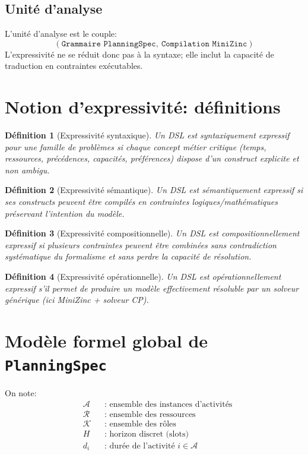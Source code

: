 \documentclass[12pt,a4paper]{article}
\newtheorem{definition}{Définition}
\begin{document}
\subsection{Unité d'analyse}
L'unité d'analyse est le couple:
\[
(\texttt{Grammaire PlanningSpec},\ \texttt{Compilation MiniZinc})
\]
L'expressivité ne se réduit donc pas à la syntaxe; elle inclut la capacité de traduction en contraintes exécutables.

\section{Notion d'expressivité: définitions}
\begin{definition}[Expressivité syntaxique]
Un DSL est syntaxiquement expressif pour une famille de problèmes si chaque concept métier critique (temps, ressources, précédences, capacités, préférences) dispose d'un construct explicite et non ambigu.
\end{definition}

\begin{definition}[Expressivité sémantique]
Un DSL est sémantiquement expressif si ses constructs peuvent être compilés en contraintes logiques/mathématiques préservant l'intention du modèle.
\end{definition}

\begin{definition}[Expressivité compositionnelle]
Un DSL est compositionnellement expressif si plusieurs contraintes peuvent être combinées sans contradiction systématique du formalisme et sans perdre la capacité de résolution.
\end{definition}

\begin{definition}[Expressivité opérationnelle]
Un DSL est opérationnellement expressif s'il permet de produire un modèle effectivement résoluble par un solveur générique (ici MiniZinc + solveur CP).
\end{definition}

\section{Modèle formel global de \texttt{PlanningSpec}}
On note:
\begin{align*}
&\mathcal{A} &&\text{: ensemble des instances d'activités} \\
&\mathcal{R} &&\text{: ensemble des ressources} \\
&\mathcal{K} &&\text{: ensemble des rôles} \\
&H &&\text{: horizon discret (slots)} \\
&d_i &&\text{: durée de l'activité } i\in\mathcal{A}
\end{align*}
\end{document}
